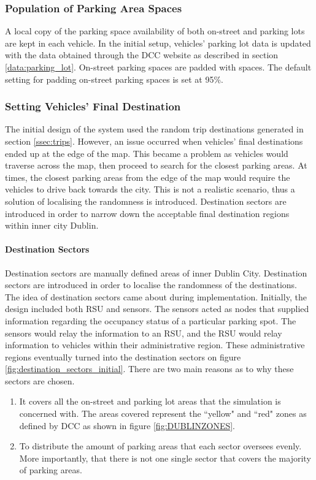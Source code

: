 \subsubsection{Population of Parking Area Spaces}
A local copy of the parking space availability of both on-street and parking lots are kept in each vehicle. In the initial setup, vehicles' parking lot data is updated with the data obtained through the \ac{DCC} website as described in section \ref{data:parking_lot}. On-street parking spaces are padded with spaces. The default setting for padding on-street parking spaces is set at 95\%.

\subsubsection{Setting Vehicles' Final Destination}
The initial design of the system used the random trip destinations generated in section \ref{ssec:trips}. However, an issue occurred when vehicles' final destinations ended up at the edge of the map. This became a problem as vehicles would traverse across the map, then proceed to search for the closest parking areas. At times, the closest parking areas from the edge of the map would require the vehicles to drive back towards the city. This is not a realistic scenario, thus a solution of localising the randomness is introduced. Destination sectors are introduced in order to narrow down the acceptable final destination regions within inner city Dublin.

\paragraph{Destination Sectors}
Destination sectors are manually defined areas of inner Dublin City. Destination sectors are introduced in order to localise the randomness of the destinations. The idea of destination sectors came about during implementation. Initially, the design included both \ac{RSU} and sensors. The sensors acted as nodes that supplied information regarding the occupancy status of a particular parking spot. The sensors would relay the information to an \ac{RSU}, and the \ac{RSU} would relay information to vehicles within their administrative region. These administrative regions eventually turned into the destination sectors on figure \ref{fig:destination_sectors_initial}. There are two main reasons as to why these sectors are chosen.

\begin{enumerate}
    \item It covers all the on-street and parking lot areas that the simulation is concerned with. The areas covered represent the ``yellow" and ``red" zones as defined by DCC as shown in figure \ref{fig:DUBLINZONES}.
    \item To distribute the amount of parking areas that each sector oversees evenly. More importantly, that there is not one single sector that covers the majority of parking areas.
\end{enumerate}

